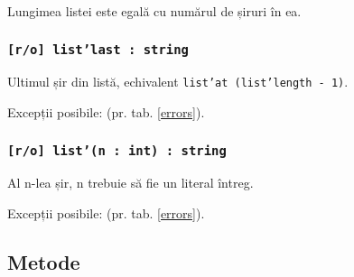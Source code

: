 Lungimea listei este egală cu numărul de șiruri în ea.

\subsubsection{\texttt{[r/o] list'last : string}}

Ultimul șir din listă, echivalent \texttt{list'at (list'length - 1)}.

Excepții posibile:  (pr. tab. \ref{errors}).

\subsubsection{\texttt{[r/o] list'(n : int) : string}}

Al n-lea șir, n trebuie să fie un literal întreg.

Excepții posibile:  (pr. tab. \ref{errors}).

\subsection{Metode}

